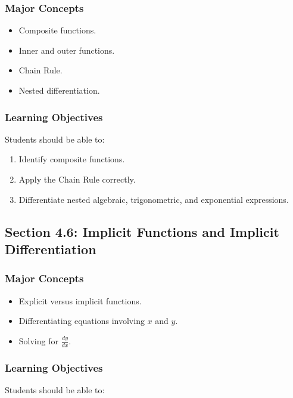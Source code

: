 \documentclass[11pt]{article}
\begin{document}
\subsubsection{Major Concepts}

\begin{itemize}
    \item Composite functions.
    \item Inner and outer functions.
    \item Chain Rule.
    \item Nested differentiation.
\end{itemize}

\subsubsection{Learning Objectives}

Students should be able to:

\begin{enumerate}
    \item Identify composite functions.
    \item Apply the Chain Rule correctly.
    \item Differentiate nested algebraic, trigonometric, and exponential
          expressions.
\end{enumerate}

\subsection{Section 4.6: Implicit Functions and Implicit Differentiation}

\subsubsection{Major Concepts}

\begin{itemize}
    \item Explicit versus implicit functions.
    \item Differentiating equations involving $x$ and $y$.
    \item Solving for $\frac{dy}{dx}$.
\end{itemize}

\subsubsection{Learning Objectives}

Students should be able to:
\end{document}
